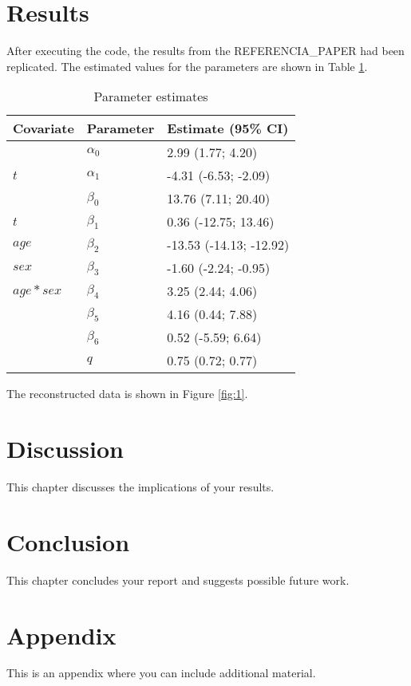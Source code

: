 \documentclass[a4paper,12pt]{article}
\begin{document}
\section{Results}
After executing the code, the results from the REFERENCIA\_PAPER had been replicated. The estimated values for the parameters are shown in Table \ref{tab:1}.
\begin{table}[h!]
    \centering
    \caption{Parameter estimates \label{tab:1}}
    \begin{tabular}{lll}
    \hline
    \textbf{Covariate} & \textbf{Parameter} & \textbf{Estimate (95\% CI)} \\
    \hline
     & $\alpha_0$ & 2.99 (1.77; 4.20) \\
        $t$ & $\alpha_1$ & -4.31 (-6.53; -2.09) \\
        & $\beta_0$ & 13.76 (7.11; 20.40) \\
        $t$ & $\beta_1$ & 0.36 (-12.75; 13.46) \\
        $age$ & $\beta_2$ & -13.53 (-14.13; -12.92) \\
        $sex$ & $\beta_3$ & -1.60 (-2.24; -0.95) \\
        $age \ast sex$ & $\beta_4$ & 3.25 (2.44; 4.06) \\
         & $\beta_5$ & 4.16 (0.44; 7.88) \\
         & $\beta_6$ & 0.52 (-5.59; 6.64) \\
         & $q$ & 0.75 (0.72; 0.77) \\
    \hline
    \end{tabular}
\end{table}
The reconstructed data is shown in Figure \ref{fig:1}.

\section{Discussion}
This chapter discusses the implications of your results.

\section{Conclusion}
This chapter concludes your report and suggests possible future work.

\appendix
\section{Appendix}
This is an appendix where you can include additional material.



\end{document}
